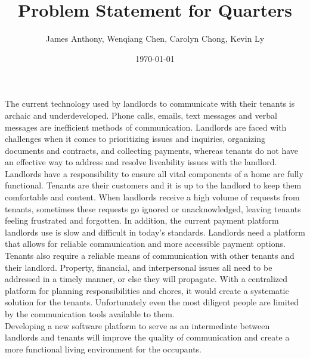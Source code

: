 \documentclass[12pt]{article}
\begin{document}
\title{Problem Statement for Quarters} 
\author{James Anthony, Wenqiang Chen, Carolyn Chong, Kevin Ly}
\date{\today}
	
\maketitle

The current technology used by landlords to communicate with their tenants is 
archaic and underdeveloped. Phone calls, emails, text messages and verbal 
messages are inefficient methods of communication. Landlords are faced with 
challenges when it comes to prioritizing issues and inquiries, organizing 
documents and contracts, and collecting payments, whereas tenants do not have an 
effective way to address and resolve liveability issues with the landlord. \\

Landlords have a responsibility to ensure all vital components of a home are 
fully functional. Tenants are their customers and it is up to the landlord to 
keep them comfortable and content. When landlords receive a high volume of 
requests from tenants, sometimes these requests go ignored or unacknowledged, 
leaving tenants feeling 
frustrated and forgotten. 
In addition, the current payment platform landlords use is slow and difficult 
in today's standards. 
Landlords need a platform that allows for reliable communication and more 
accessible payment options. \\

Tenants also require a reliable means of communication with other tenants and their 
landlord. Property, financial, and interpersonal issues all need to be addressed 
in a timely manner, or else they will propagate. With a centralized 
platform for planning responsibilities and chores, it would create a systematic 
solution for the tenants. Unfortunately even the most diligent people are limited 
by the communication tools available to them. \\

Developing a new software platform to serve as an intermediate between 
landlords and tenants will improve the quality of communication 
and create a more functional living environment for the occupants.
\end{document}
